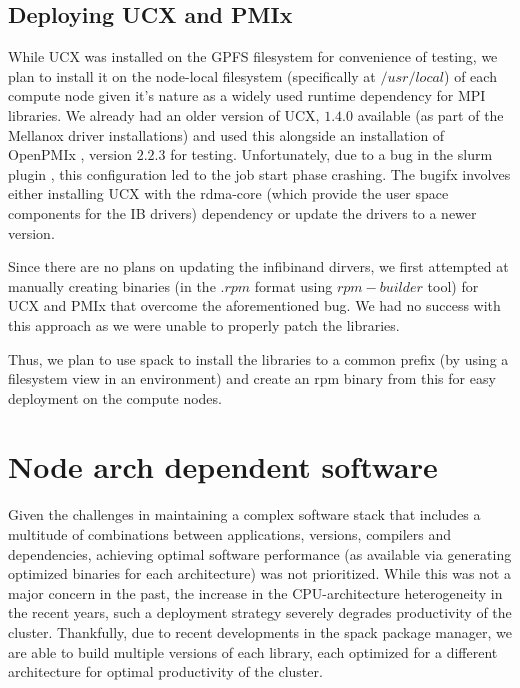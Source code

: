 \documentclass[sigconf,authordraft]{acmart}
\begin{document}
\subsection{Deploying UCX and PMIx}
While UCX was installed on the GPFS filesystem for convenience of testing, we plan to install it on the node-local filesystem (specifically at $/usr/local$) of each compute node given it's nature as a widely used runtime dependency for MPI libraries. We already had an older version of UCX, $1.4.0$ available (as part of the Mellanox driver installations) and used this alongside an installation of OpenPMIx \cite{openpmix_website}, version $2.2.3$ for testing. Unfortunately, due to a bug in the slurm plugin \cite{slurm_ucx_bug}, this configuration led to the job start phase crashing. The bugifx involves either installing UCX with the rdma-core \cite{rdmacore_repository}(which provide the user space components for the IB drivers) dependency or update the drivers to a newer version.

Since there are no plans on updating the infibinand dirvers, we first attempted at manually creating binaries (in the $.rpm$ format using $rpm-builder$ tool) for UCX and PMIx that overcome the aforementioned bug. We had no success with this approach as we were unable to properly patch the libraries.

Thus, we plan to use spack \cite{spack} to install the libraries to a common prefix (by using a filesystem view in an environment) and create an rpm binary from this for easy deployment on the compute nodes.

\section{Node arch dependent software}

Given the challenges in maintaining a complex software stack that includes a multitude of combinations between applications, versions, compilers and dependencies, achieving optimal software performance (as available via generating optimized binaries for each architecture) was not prioritized. While this was not a major concern in the past, the increase in the CPU-architecture heterogeneity in the recent years, such a deployment strategy severely degrades productivity of the cluster. Thankfully, due to recent developments in the spack package manager, we are able to build multiple versions of each library, each optimized for a different architecture for optimal productivity of the cluster. 
\end{document}
